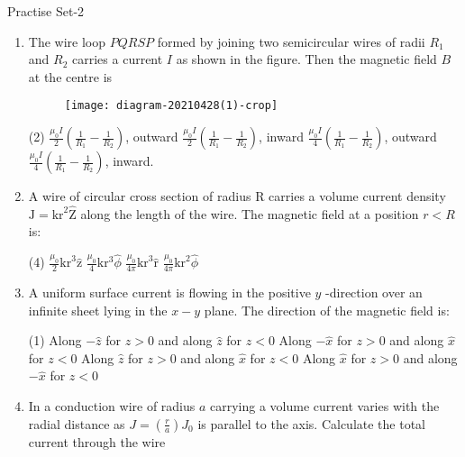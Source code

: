 \begin{abox}
	Practise Set-2
\end{abox}
\begin{enumerate}[ label=\color{ocre}\textbf{\arabic*.}]
	\item The wire loop $P Q R S P$ formed by joining two semicircular wires of radii $R_{1}$ and $R_{2}$ carries a current $I$ as shown in the figure. Then the magnetic field $B$ at the centre is 
	\begin{figure}[H]
		\begin{center}
			\texttt{[image: diagram-20210428(1)-crop]}
		\end{center}
	\end{figure}
	\begin{tasks}(2)
		\task[\textbf{a.}] $\frac{\mu_{0} I}{2}\left(\frac{1}{R_{1}}-\frac{1}{R_{2}}\right)$, outward
		\task[\textbf{b.}]$\frac{\mu_{0} I}{2}\left(\frac{1}{R_{1}}-\frac{1}{R_{2}}\right)$, inward
		\task[\textbf{c.}] $\frac{\mu_{0} I}{4}\left(\frac{1}{R_{1}}-\frac{1}{R_{2}}\right)$, outward
		\task[\textbf{d.}]  $\frac{\mu_{0} I}{4}\left(\frac{1}{R_{1}}-\frac{1}{R_{2}}\right)$, inward.
	\end{tasks}
	\item A wire of circular cross section of radius $\mathrm{R}$ carries a volume current density $\mathrm{J}=\mathrm{kr}^{2} \hat{\mathrm{Z}}$ along the length of the wire. The magnetic field at a position $r<R$ is:
	\begin{tasks}(4)
		\task[\textbf{a.}] $\frac{\mu_{0}}{2} \mathrm{kr}^{3} \hat{\mathrm{z}}$
		\task[\textbf{b.}]$\frac{\mu_{0}}{4} \mathrm{k} \mathrm{r}^{3} \hat{\phi}$
		\task[\textbf{c.}] $\frac{\mu_{0}}{4 \pi} \mathrm{kr}^{3} \hat{\mathrm{r}}$ 
		\task[\textbf{d.}]  $\frac{\mu_{0}}{4 \pi} \mathrm{kr}^{2} \hat{\phi}$
	\end{tasks}
	\item A uniform surface current is flowing in the positive $y$ -direction over an infinite sheet lying in the $x-y$ plane. The direction of the magnetic field is:
	\begin{tasks}(1)
		\task[\textbf{a.}] Along $-\hat{z}$ for $z>0$ and along $\hat{z}$ for $z<0$
		\task[\textbf{b.}]Along $-\hat{x}$ for $z>0$ and along $\hat{x}$ for $z<0$
		\task[\textbf{c.}] Along $\hat{z}$ for $z>0$ and along $\hat{x}$ for $z<0$
		\task[\textbf{d.}] Along $\hat{x}$ for $z>0$ and along $-\hat{x}$ for $z<0$
	\end{tasks}
	\item In a conduction wire of radius $a$ carrying a volume current varies with the radial distance as $J=(\frac{r}{a})J_0$ is parallel to the axis. Calculate the total current through the wire 

\end{enumerate}
